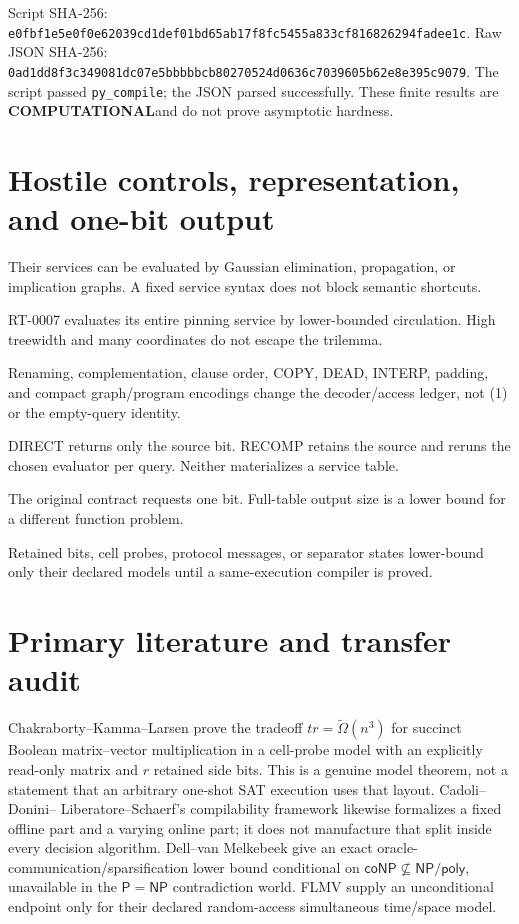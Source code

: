 \documentclass[11pt]{article}
\newcommand{\COMP}{\textbf{COMPUTATIONAL}}
\begin{document}
Script SHA-256:
\texttt{e0fbf1e5e0f0e62039cd1def01bd65ab17f8fc5455a833cf816826294fadee1c}.
Raw JSON SHA-256:
\texttt{0ad1dd8f3c349081dc07e5bbbbbcb80270524d0636c7039605b62e8e395c9079}.
The script passed \texttt{py\_compile}; the JSON parsed successfully.  These
finite results are \COMP and do not prove asymptotic hardness.

\section{Hostile controls, representation, and one-bit output}

\begin{description}[leftmargin=3.2cm,style=nextline]
\item[Affine/Horn/2-SAT.]  Their services can be evaluated by Gaussian
elimination, propagation, or implication graphs.  A fixed service syntax does
not block semantic shortcuts.
\item[Paired high-treewidth core.]  RT-0007 evaluates its entire pinning
service by lower-bounded circulation.  High treewidth and many coordinates do
not escape the trilemma.
\item[Alternative encodings.]  Renaming, complementation, clause order,
COPY, DEAD, INTERP, padding, and compact graph/program encodings change the
decoder/access ledger, not (1) or the empty-query identity.
\item[DIRECT/RECOMP.]  DIRECT returns only the source bit.  RECOMP retains
the source and reruns the chosen evaluator per query.  Neither materializes a
service table.
\item[One-bit output.]  The original contract requests one bit.  Full-table
output size is a lower bound for a different function problem.
\item[Memory/communication.]  Retained bits, cell probes, protocol messages,
or separator states lower-bound only their declared models until a
same-execution compiler is proved.
\end{description}

\section{Primary literature and transfer audit}

Chakraborty--Kamma--Larsen prove the tradeoff
$tr=\widetilde\Omega(n^3)$ for succinct Boolean matrix--vector
multiplication in a cell-probe model with an explicitly read-only matrix and
$r$ retained side bits.  This is a genuine model theorem, not a statement
that an arbitrary one-shot SAT execution uses that layout.  Cadoli--Donini--
Liberatore--Schaerf's compilability framework likewise formalizes a fixed
offline part and a varying online part; it does not manufacture that split
inside every decision algorithm.  Dell--van Melkebeek give an exact
oracle-communication/sparsification lower bound conditional on
$\mathsf{coNP}\not\subseteq\mathsf{NP/poly}$, unavailable in the
$\mathsf P=\mathsf{NP}$ contradiction world.  FLMV supply an unconditional
endpoint only for their declared random-access simultaneous time/space model.
\end{document}
